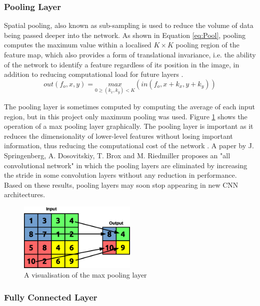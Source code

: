 \documentclass[12pt]{article}
\begin{document}
\subsubsection{Pooling Layer}
\label{sec:Background-CNN-Pool}


Spatial pooling, also known as sub-sampling is used to reduce the volume of data being passed deeper into the network. As shown in Equation \ref{eq:Pool}, pooling computes the maximum value within a localised $K\times K$ pooling region of the feature map, which also provides a form of translational invariance, i.e. the ability of the network to identify a feature regardless of its position in the image, in addition to reducing computational load for future layers \cite{PoolAnalysis}. 
\begin{equation}
out(f_o,x,y)=\underset{0\geqslant (k_x,k_y)<K}{max}(in(f_o,x+k_x,y+k_y))
\label{eq:Pool}
\end{equation}

The pooling layer is sometimes computed by computing the average of each input region, but in this project only maximum pooling was used. Figure \ref{fig:pool} shows the operation of a max pooling layer graphically. The pooling layer is important as it reduces the dimensionality of lower-level features without losing important information, thus reducing the computational cost of the network \cite{SudaFpgaAccelerator}. A paper by J. Springenberg, A. Dosovitskiy, T. Brox and M. Riedmiller proposes an "all convolutional network" in which the pooling layers are eliminated by increasing the stride in some convolution layers without any reduction in performance\cite{AllConv}. Based on these results, pooling layers may soon stop appearing in new CNN architectures.

\begin{figure} [H]
\centering
\includegraphics[width=0.5\textwidth]{figures/pool.eps}
\caption{A visualisation of the max pooling layer}
\label{fig:pool}
\end{figure}

\subsubsection{Fully Connected Layer}
\label{sec:Background-CNN-FC}
\end{document}
